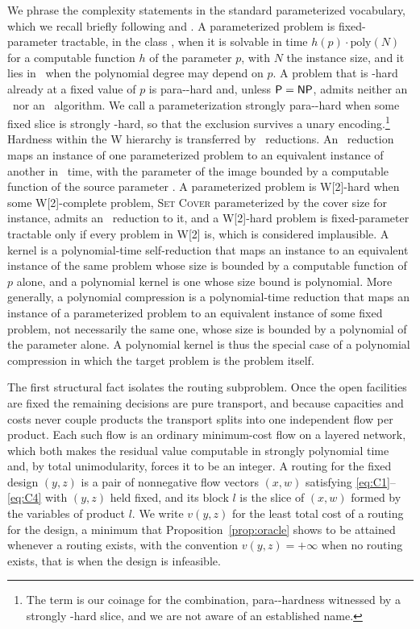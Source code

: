 We phrase the complexity statements in the standard parameterized
vocabulary, which we recall briefly following
\citet{DowneyFellows2013} and \citet{Cygan2015}. A parameterized problem
is fixed-parameter tractable, in the class \FPT, when it is solvable in
time $h(p)\cdot\mathrm{poly}(N)$ for a computable function $h$ of the
parameter $p$, with $N$ the instance size, and it lies in \XP\ when the
polynomial degree may depend on $p$. A problem that is \NP-hard already at
a fixed value of $p$ is para-\NP-hard and, unless $\textsf{P}=\textsf{NP}$, admits
neither an \FPT\ nor an \XP\ algorithm. We call a parameterization
strongly para-\NP-hard when some fixed slice is strongly \NP-hard, so
that the exclusion survives a unary encoding.\footnote{The term is our
coinage for the combination, para-\NP-hardness witnessed by a strongly
\NP-hard slice, and we are not aware of an established name.} Hardness within the W
hierarchy is transferred by \FPT\ reductions. An \FPT\ reduction maps an
instance of one parameterized problem to an equivalent instance of
another in \FPT\ time, with the parameter of the image bounded by a
computable function of the source parameter
\citep{DowneyFellows2013,Cygan2015}. A parameterized problem is
W[2]-hard when some W[2]-complete problem, \textsc{Set Cover}
parameterized by the cover size for instance, admits an \FPT\ reduction
to it, and a W[2]-hard problem is fixed-parameter tractable only if
every problem in W[2] is, which is considered implausible. A kernel is a
polynomial-time self-reduction that maps an instance to an equivalent
instance of the same problem whose size is bounded by a computable
function of $p$ alone, and a polynomial kernel is one whose size bound is
polynomial. More generally, a polynomial compression is a polynomial-time
reduction that maps an instance of a parameterized problem to an
equivalent instance of some fixed problem, not necessarily the same one,
whose size is bounded by a polynomial of the parameter alone. A
polynomial kernel is thus the special case of a polynomial compression in
which the target problem is the problem itself.

The first structural fact isolates the routing subproblem. Once the open
facilities are fixed the remaining decisions are pure transport, and
because capacities and costs never couple products the transport splits
into one independent flow per product. Each such flow is an ordinary
minimum-cost flow on a layered network, which both makes the residual
value computable in strongly polynomial time and, by total unimodularity,
forces it to be an integer. A routing for the fixed design $(y,z)$ is a
pair of nonnegative flow vectors $(x,w)$ satisfying
\eqref{eq:C1}--\eqref{eq:C4} with $(y,z)$ held fixed, and its block $l$ is
the slice of $(x,w)$ formed by the variables of product $l$. We write
$v(y,z)$ for the least total cost of a routing for the design, a minimum
that Proposition~\ref{prop:oracle} shows to be attained whenever a routing
exists, with the convention $v(y,z)=+\infty$ when no routing exists, that
is when the design is infeasible.

